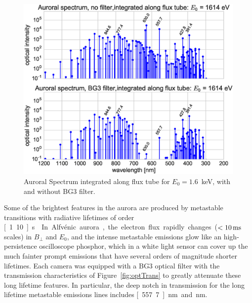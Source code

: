 \begin{figure}
    \includegraphics[width=\columnwidth,trim=0 10 0 0,clip]{gfx/hirsc7}
    \caption{Auroral Spectrum integrated along flux tube for $E_0=1.6$~keV, with and without BG3 filter.}\label{fig:spectra}
\end{figure} 
%
Some of the brightest features in the aurora are produced by metastable transitions with radiative lifetimes of order \unit[1..10]{s} \citep{vallancejones1974}. 
In Alfvénic aurora, the electron flux rapidly changes ($< \unit[10]{ms}$ scales) in $B_\perp$ and $E_0$, and the intense metastable emissions glow like an high-persistence oscilloscope phosphor, which in a white light sensor can cover up the much fainter prompt emissions that have several orders of magnitude shorter lifetimes.
Each camera was equipped with a BG3 optical filter with the transmission characteristics of Figure~\ref{fig:optTrans} to greatly attenuate these long lifetime features.
In particular, the deep notch in transmission for the long lifetime metastable emissions lines includes \unit[557.7]{nm} and \unit[630]{nm}.
%
